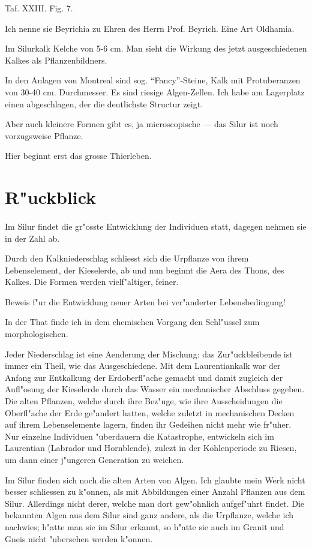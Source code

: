 \documentclass[a4paper, 11pt, oneside, german]{article}
\begin{document}
Taf. XXIII. Fig. 7.

Ich nenne sie Beyrichia zu Ehren des Herrn Prof. Beyrich. Eine Art Oldhamia.

Im Silurkalk Kelche von 5-6 cm. Man sieht die Wirkung des jetzt ausgeschiedenen Kalkes als Pflanzenbildners.

In den Anlagen von Montreal sind sog. "`Fancy"'-Steine, Kalk mit Protuberanzen von 30-40 cm. Durchmesser. Es sind riesige Algen-Zellen. Ich habe am Lagerplatz einen abgeschlagen, der die deutlichste Structur zeigt.

Aber auch kleinere Formen gibt es, ja microscopische --- das Silur ist noch vorzugsweise Pflanze.

Hier beginnt erst das grosse Thierleben.
\clearpage
\section{R"uckblick}
\paragraph{}
Im Silur findet die gr"osste Entwicklung der Individuen statt, dagegen nehmen sie in der Zahl ab.

Durch den Kalkniederschlag schliesst sich die Urpflanze von ihrem Lebenselement, der Kieselerde, ab und nun beginnt die Aera des Thons, des Kalkes. Die Formen werden vielf"altiger, feiner.

Beweis f"ur die Entwicklung neuer Arten bei ver"anderter Lebensbedingung!

In der That finde ich in dem chemischen Vorgang den Schl"ussel zum morphologischen.

Jeder Niederschlag ist eine Aenderung der Mischung: das Zur"uckbleibende ist immer ein Theil, wie das Ausgeschiedene. Mit dem Laurentiankalk war der Anfang zur Entkalkung der Erdoberfl"ache gemacht und damit zugleich der Aufl"osung der Kieselerde durch das Wasser ein mechanischer Abschluss gegeben. Die alten Pflanzen, welche durch ihre Bez"uge, wie ihre Ausscheidungen die Oberfl"ache der Erde ge"andert hatten, welche zuletzt in mechanischen Decken auf ihrem Lebenselemente lagern, finden ihr Gedeihen nicht mehr wie fr"uher. Nur einzelne Individuen "uberdauern die Katastrophe, entwickeln sich im Laurentian (Labrador und Hornblende), zulezt in der Kohlenperiode zu Riesen, um dann einer j"ungeren Generation zu weichen.

Im Silur finden sich noch die alten Arten von Algen. Ich glaubte mein Werk nicht besser schliessen zu k"onnen, als mit Abbildungen einer Anzahl Pflanzen aus dem Silur. Allerdings nicht derer, welche man dort gew"ohnlich aufgef"uhrt findet. Die bekannten Algen aus dem Silur sind ganz andere, als die Urpflanze, welche ich nachwies; h"atte man sie im Silur erkannt, so h"atte sie auch im Granit und Gneis nicht "ubersehen werden k"onnen.
\end{document}

